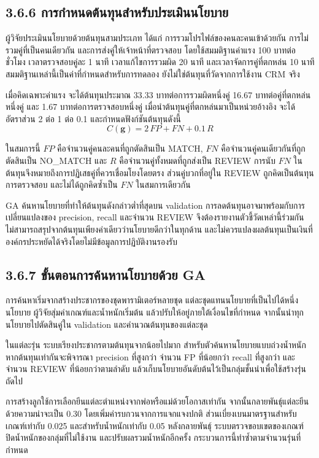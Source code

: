 \subsection*{3.6.6 การกำหนดต้นทุนสำหรับประเมินนโยบาย}
ผู้วิจัยประเมินนโยบายด้วยต้นทุนสามประเภท ได้แก่ การรวมโปรไฟล์ของคนละคนเข้าด้วยกัน การไม่รวมคู่ที่เป็นคนเดียวกัน และการส่งคู่ให้เจ้าหน้าที่ตรวจสอบ โดยใช้สมมติฐานค่าแรง 100 บาทต่อชั่วโมง เวลาตรวจสอบคู่ละ 1 นาที เวลาแก้ไขการรวมผิด 20 นาที และเวลาจัดการคู่ที่ตกหล่น 10 นาที สมมติฐานเหล่านี้เป็นค่าที่กำหนดสำหรับการทดลอง ยังไม่ใช่ต้นทุนที่วัดจากการใช้งาน CRM จริง

เมื่อคิดเฉพาะค่าแรง จะได้ต้นทุนประมาณ 33.33 บาทต่อการรวมผิดหนึ่งคู่ 16.67 บาทต่อคู่ที่ตกหล่นหนึ่งคู่ และ 1.67 บาทต่อการตรวจสอบหนึ่งคู่ เมื่อนำต้นทุนคู่ที่ตกหล่นมาเป็นหน่วยอ้างอิง จะได้อัตราส่วน 2 ต่อ 1 ต่อ 0.1 และกำหนดฟังก์ชันต้นทุนดังนี้
\begin{equation*}
C(\boldsymbol{g})=2\,FP+FN+0.1\,R
\end{equation*}

ในสมการนี้ $FP$ คือจำนวนคู่คนละคนที่ถูกตัดสินเป็น MATCH, $FN$ คือจำนวนคู่คนเดียวกันที่ถูกตัดสินเป็น NO\_MATCH และ $R$ คือจำนวนคู่ทั้งหมดที่ถูกส่งเป็น REVIEW การนับ $FN$ ในต้นทุนจึงหมายถึงการปฏิเสธคู่ที่ควรเชื่อมโยงโดยตรง ส่วนคู่บวกที่อยู่ใน REVIEW ถูกคิดเป็นต้นทุนการตรวจสอบ และไม่ได้ถูกคิดซ้ำเป็น $FN$ ในสมการเดียวกัน

GA ค้นหานโยบายที่ทำให้ต้นทุนดังกล่าวต่ำที่สุดบน validation การลดต้นทุนอาจมาพร้อมกับการเปลี่ยนแปลงของ precision, recall และจำนวน REVIEW จึงต้องรายงานตัวชี้วัดเหล่านี้ร่วมกัน ไม่สามารถสรุปจากต้นทุนเพียงค่าเดียวว่านโยบายดีกว่าในทุกด้าน และไม่ควรแปลงผลต้นทุนเป็นเงินที่องค์กรประหยัดได้จริงโดยไม่มีข้อมูลการปฏิบัติงานรองรับ

\subsection*{3.6.7 ขั้นตอนการค้นหานโยบายด้วย GA}
การค้นหาเริ่มจากสร้างประชากรของชุดพารามิเตอร์หลายชุด แต่ละชุดแทนนโยบายที่เป็นไปได้หนึ่งนโยบาย ผู้วิจัยสุ่มค่าเกณฑ์และน้ำหนักเริ่มต้น แล้วปรับให้อยู่ภายใต้เงื่อนไขที่กำหนด จากนั้นนำทุกนโยบายไปตัดสินคู่ใน validation และคำนวณต้นทุนของแต่ละชุด

ในแต่ละรุ่น ระบบเรียงประชากรตามต้นทุนจากน้อยไปมาก สำหรับตัวค้นหานโยบายแบบถ่วงน้ำหนัก หากต้นทุนเท่ากันจะพิจารณา precision ที่สูงกว่า จำนวน FP ที่น้อยกว่า recall ที่สูงกว่า และจำนวน REVIEW ที่น้อยกว่าตามลำดับ แล้วเก็บนโยบายอันดับต้นไว้เป็นกลุ่มชั้นนำเพื่อใช้สร้างรุ่นถัดไป

การสร้างลูกใช้การเลือกยีนแต่ละตำแหน่งจากพ่อหรือแม่ด้วยโอกาสเท่ากัน จากนั้นกลายพันธุ์แต่ละยีนด้วยความน่าจะเป็น 0.30 โดยเพิ่มค่ารบกวนจากการแจกแจงปกติ ส่วนเบี่ยงเบนมาตรฐานสำหรับเกณฑ์เท่ากับ 0.025 และสำหรับน้ำหนักเท่ากับ 0.05 หลังกลายพันธุ์ ระบบตรวจขอบเขตของเกณฑ์ ปิดน้ำหนักของกลุ่มที่ไม่ใช้งาน และปรับผลรวมน้ำหนักอีกครั้ง กระบวนการนี้ทำซ้ำตามจำนวนรุ่นที่กำหนด

